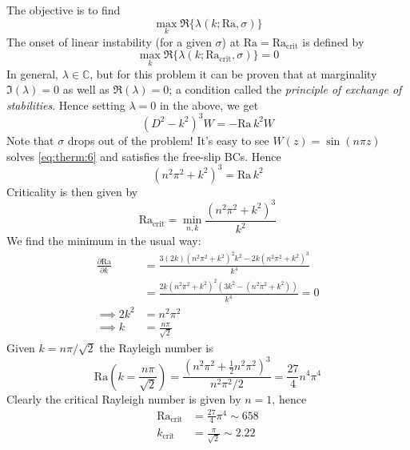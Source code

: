 \documentclass{jknotes}
\newcommand{\Ra}{\text{Ra}}
\begin{document}
The objective is to find 
\begin{equation}
	\max_k \Re\{ \lambda(k;\Ra,\sigma)\}
\end{equation}
The onset of linear instability (for a given $\sigma$) at $\Ra =
\Ra_{\text{crit}}$ is defined by
\begin{equation}
	\max_k \Re\{\lambda(k; \Ra_{\text{crit}},\sigma)\} = 0
\end{equation}
In general, $\lambda \in \mathbb{C}$, but for this problem it can be proven
that at marginality $\Im(\lambda) = 0$ as well as $\Re(\lambda) = 0$; a
condition called the \emph{principle of exchange of stabilities}. Hence
setting $\lambda = 0$ in the above, we get
\begin{equation}
	(D^2 - k^2)^3 W = - \Ra \,k^2 W
	\label{eq:therm:6}
\end{equation}
Note that $\sigma$ drops out of the problem! It's easy to see $W(z) = \sin
(n\pi z)$ solves \eqref{eq:therm:6} and satisfies the free-slip BCs. Hence
\begin{equation}
	(n^2 \pi^2 + k^2)^3 = \Ra \,k^2
\end{equation}
Criticality is then given by
\begin{equation}
	\Ra_{\text{crit}} = \min_{n,k} \frac{(n^2 \pi^2 + k^2)^3}{k^2}
\end{equation}
We find the minimum in the usual way:
\begin{align}
	\frac{\partial \Ra}{\partial k} &= \frac{3(2k)(n^2\pi^2 + k^2)^2 k^2 -
	2k(n^2\pi^2 + k^2)^3}{k^4} \\
									&= \frac{2k(n^2\pi^2
									+k^2)^2(3k^2-(n^2\pi^2+k^2))}{k^4} = 0\\
		\implies 2k^2 &= n^2 \pi^2 \\
		\implies k &= \frac{n\pi}{\sqrt{2}}
\end{align}
Given $k = n\pi/\sqrt{2}$ the Rayleigh number is
\begin{equation}
	\Ra(k = \frac{n\pi}{\sqrt{2}}) = \frac{(n^2\pi^2 +
	\frac{1}{2}n^2\pi^2)^3}{n^2 \pi^2/2} = \frac{27}{4}n^4 \pi^4
\end{equation}
Clearly the critical Rayleigh number is given by $n=1$, hence
\begin{align}
	\Ra_{\text{crit}} &= \frac{27}{4}\pi^4 \sim 658 \\
	k_{\text{crit}} &= \frac{\pi}{\sqrt{2}} \sim 2.22
\end{align}
\end{document}
